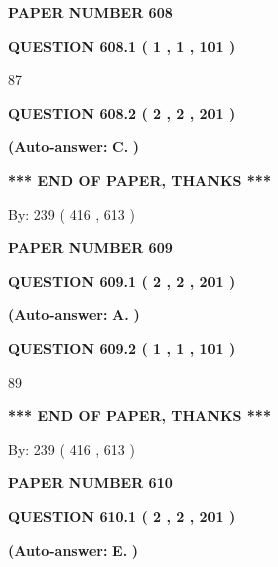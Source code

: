 \documentclass[12pt]{article}
\begin{document}
   
\newpage 
\setcounter{page}{ 
   608001 } 
   
   
 {\textbf{ \Large{ PAPER NUMBER  608  }}}
   
   
   
   
  
  
{\textbf{\large{QUESTION
608.1 
 ( 1 , 1 , 101 )
}}}

87
  
  
{\textbf{\large{QUESTION
608.2 
 ( 2 , 2 , 201 )
}}}
 
 
{\textbf{(Auto-answer:}}
{\textbf{\large{
C.}}}
{\textbf{)}}
 
 
   
   
   
   
\vspace{1.0in} 
{\textbf{\large{ *** END OF PAPER, THANKS *** }}} 
   
   
\hspace{1.0in} By: 
 239 ( 416 ,  613 )
   
   
   
   
\newpage 
\setcounter{page}{ 
   609001 } 
   
   
 {\textbf{ \Large{ PAPER NUMBER  609  }}}
   
   
   
   
  
  
{\textbf{\large{QUESTION
609.1 
 ( 2 , 2 , 201 )
}}}
 
 
{\textbf{(Auto-answer:}}
{\textbf{\large{
A.}}}
{\textbf{)}}
 
 
  
  
{\textbf{\large{QUESTION
609.2 
 ( 1 , 1 , 101 )
}}}

89
   
   
   
   
\vspace{1.0in} 
{\textbf{\large{ *** END OF PAPER, THANKS *** }}} 
   
   
\hspace{1.0in} By: 
 239 ( 416 ,  613 )
   
   
   
   
\newpage 
\setcounter{page}{ 
   610001 } 
   
   
 {\textbf{ \Large{ PAPER NUMBER  610  }}}
   
   
   
   
  
  
{\textbf{\large{QUESTION
610.1 
 ( 2 , 2 , 201 )
}}}
 
 
{\textbf{(Auto-answer:}}
{\textbf{\large{
E.}}}
{\textbf{)}}
 
 
  
\end{document}
